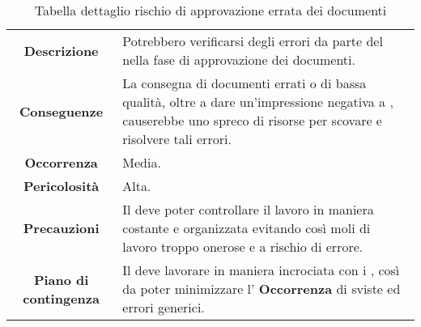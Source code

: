 \renewcommand{\arraystretch}{1}
    \begin{table}[H]
        \begin{center}
            \setlength{\aboverulesep}{0pt}
            \setlength{\belowrulesep}{0pt}
            \setlength{\extrarowheight}{.75ex}
            \begin{tabular}{ c p{10cm} }
                		\toprule 
		\rowcolor{AzzurroGruppo!30}
		\multicolumn{2}{c}{\textbf{Approvazione errata dei documenti}}\\
                \toprule
                \textbf{Descrizione} & Potrebbero verificarsi degli errori da parte del \RdP{} nella fase di approvazione dei documenti. \\
                \textbf{Conseguenze} & La consegna di documenti errati o di bassa qualità, oltre a dare un'impressione negativa a \proponente{}, causerebbe uno spreco di risorse per scovare e risolvere tali errori. \\
                 \textbf{Occorrenza} & Media. \\
                \textbf{Pericolosità}  & Alta. \\
                \textbf{Precauzioni} & Il \RdP{} deve poter controllare il lavoro in maniera costante e organizzata evitando così moli di lavoro troppo onerose e a rischio di errore. \\
                 \textbf{Piano di contingenza} & Il \RdP{} deve lavorare in maniera incrociata con i \vers{}, così da poter minimizzare l' \textbf{Occorrenza} di sviste ed errori generici. \\
                \bottomrule
            \end{tabular}
            \caption{Tabella dettaglio rischio di approvazione errata dei documenti}
        \end{center}
    \end{table}


